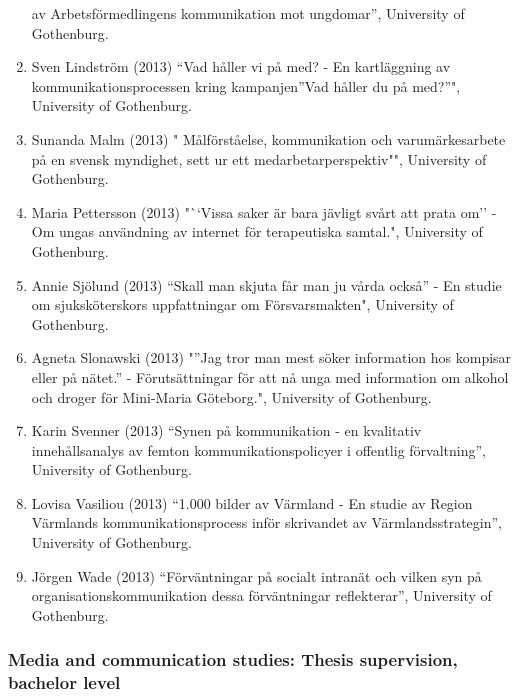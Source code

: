 \documentclass[
]{article}
\begin{document}
\begin{enumerate}
  av Arbetsförmedlingens kommunikation mot ungdomar'', University of
  Gothenburg.
\item
  Sven Lindström (2013) ``Vad håller vi på med? - En kartläggning av
  kommunikationsprocessen kring kampanjen''Vad håller du på med?''",
  University of Gothenburg.
\item
  Sunanda Malm (2013) " Målförståelse, kommunikation och
  varumärkesarbete på en svensk myndighet, sett ur ett
  medarbetarperspektiv"", University of Gothenburg.
\item
  Maria Pettersson (2013) "``Vissa saker är bara jävligt svårt att prata
  om'' - Om ungas användning av internet för terapeutiska samtal.",
  University of Gothenburg.
\item
  Annie Sjölund (2013) ``Skall man skjuta får man ju vårda också'' - En
  studie om sjuksköterskors uppfattningar om Försvarsmakten", University
  of Gothenburg.
\item
  Agneta Slonawski (2013) "''Jag tror man mest söker information hos
  kompisar eller på nätet.'' - Förutsättningar för att nå unga med
  information om alkohol och droger för Mini-Maria Göteborg.",
  University of Gothenburg.
\item
  Karin Svenner (2013) ``Synen på kommunikation - en kvalitativ
  innehållsanalys av femton kommunikationspolicyer i offentlig
  förvaltning'', University of Gothenburg.
\item
  Lovisa Vasiliou (2013) ``1.000 bilder av Värmland - En studie av
  Region Värmlands kommunikationsprocess inför skrivandet av
  Värmlandsstrategin'', University of Gothenburg.
\item
  Jörgen Wade (2013) ``Förväntningar på socialt intranät och vilken syn
  på organisationskommunikation dessa förväntningar reflekterar'',
  University of Gothenburg.
\end{enumerate}

\hypertarget{media-and-communication-studies-thesis-supervision-bachelor-level}{%
\subsubsection{Media and communication studies: Thesis supervision,
bachelor
level}\label{media-and-communication-studies-thesis-supervision-bachelor-level}}
\end{document}
